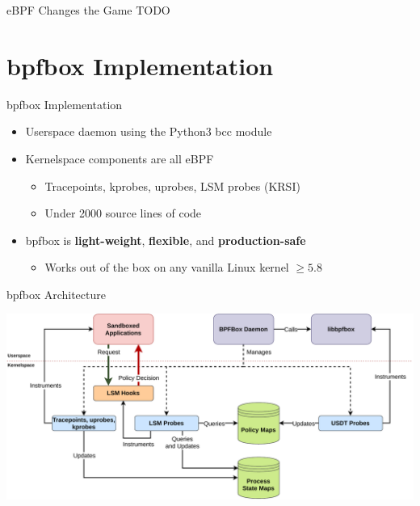 \documentclass[12pt, dvipsnames]{beamer}
\begin{document}

\begin{frame}[c]{eBPF Changes the Game}
TODO
\end{frame}

\section{bpfbox Implementation}

\begin{frame}[c]{bpfbox Implementation}
\begin{itemize}
    \item Userspace daemon using the Python3 bcc module
    \vfill
    \item Kernelspace components are all eBPF
    \begin{itemize}
        \item Tracepoints, kprobes, uprobes, LSM probes (KRSI)
        \item Under 2000 source lines of code
    \end{itemize}
    \vfill
    \item bpfbox is \textbf{light-weight}, \textbf{flexible}, and \textbf{production-safe}
    \begin{itemize}
        \item Works out of the box on any vanilla Linux kernel $\ge 5.8$
    \end{itemize}
\end{itemize}
\end{frame}

\begin{frame}[c]{bpfbox Architecture}
\begin{center}
    \color{black}
    \includegraphics[width=1\textwidth]{figs/bpfbox-overview.pdf}
\end{center}
\end{frame}
\end{document}
